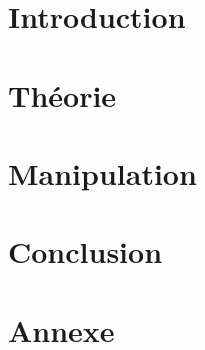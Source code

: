 \documentclass[a4paper,french,twoside,10pt]{report}
\begin{document}
\pagestyle{fancy}

\tableofcontents

\newpage

\section{Introduction}

\newpage


\section{Théorie}

\newpage

\section{Manipulation}

\newpage

\section{Conclusion}


\newpage
\section{Annexe}


\listoffigures

\listoftables
\end{document}
